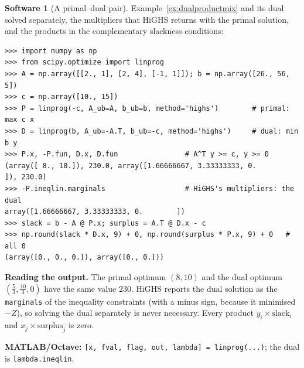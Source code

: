 \documentclass[11pt,a4paper]{article}
\numberwithin{equation}{section}
\theoremstyle{definition}
\newtheorem{software}[thm]{Software}
\begin{document}
\begin{software}[A primal--dual pair]
\label{sw:dual}
Example~\ref{ex:dualproductmix} and its dual solved separately, the multipliers that HiGHS returns with the primal solution, and the products in the complementary slackness conditions:
{\small\begin{verbatim}
>>> import numpy as np
>>> from scipy.optimize import linprog
>>> A = np.array([[2., 1], [2, 4], [-1, 1]]); b = np.array([26., 56, 5])
>>> c = np.array([10., 15])
>>> P = linprog(-c, A_ub=A, b_ub=b, method='highs')        # primal: max c x
>>> D = linprog(b, A_ub=-A.T, b_ub=-c, method='highs')     # dual: min b y
>>> P.x, -P.fun, D.x, D.fun                # A^T y >= c, y >= 0
(array([ 8., 10.]), 230.0, array([1.66666667, 3.33333333, 0.        ]), 230.0)
>>> -P.ineqlin.marginals                   # HiGHS's multipliers: the dual
array([1.66666667, 3.33333333, 0.        ])
>>> slack = b - A @ P.x; surplus = A.T @ D.x - c
>>> np.round(slack * D.x, 9) + 0, np.round(surplus * P.x, 9) + 0   # all 0
(array([0., 0., 0.]), array([0., 0.]))
\end{verbatim}}
\textbf{Reading the output.} The primal optimum $(8, 10)$ and the dual optimum $(\frac53, \frac{10}3, 0)$ have the same value $230$. HiGHS reports the dual solution as the \texttt{marginals} of the inequality constraints (with a minus sign, because it minimised $-Z$), so solving the dual separately is never necessary.
Every product $y_i \times \text{slack}_i$ and $x_j \times \text{surplus}_j$ is zero.

\textbf{MATLAB/Octave:} \texttt{[x, fval, flag, out, lambda] = linprog(...)}; the dual is \texttt{lambda.ineqlin}.
\end{software}
\end{document}
